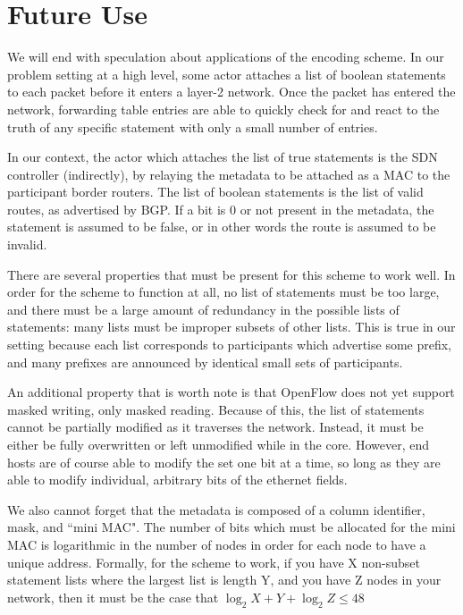 \section{Future Use}

We will end with speculation about applications of the encoding scheme. In our problem setting at a high level, some actor attaches a list of boolean statements to each packet before it enters a layer-2 network. Once the packet has entered the network, forwarding table entries are able to quickly check for and react to the truth of any specific statement with only a small number of entries. 

In our context, the actor which attaches the list of true statements is the SDN controller (indirectly), by relaying the metadata to be attached as a MAC to the participant border routers. The list of boolean statements is the list of valid routes, as advertised by BGP. If a bit is 0 or not present in the metadata, the statement is assumed to be false, or in other words the route is assumed to be invalid.

There are several properties that must be present for this scheme to work well. In order for the scheme to function at all, no list of statements must be too large, and there must be a large amount of redundancy in the possible lists of statements: many lists must be improper subsets of other lists. This is true in our setting because each list corresponds to participants which advertise some prefix, and many prefixes are announced by identical small sets of participants. 

An additional property that is worth note is that OpenFlow does not yet support masked writing, only masked reading. Because of this, the list of statements cannot be partially modified as it traverses the network. Instead, it must be either be fully overwritten or left unmodified while in the core. However, end hosts are of course able to modify the set one bit at a time, so long as they are able to modify individual, arbitrary bits of the ethernet fields.

We also cannot forget that the metadata is composed of a column identifier, mask, and ``mini MAC". The number of bits which must be allocated for the mini MAC is logarithmic in the number of nodes in order for each node to have a unique address. Formally, for the scheme to work, if you have X non-subset statement lists where the largest list is length Y, and you have Z nodes in your network, then it must be the case that 
$\log_2{X} + Y + \log_2{Z} \le 48$


